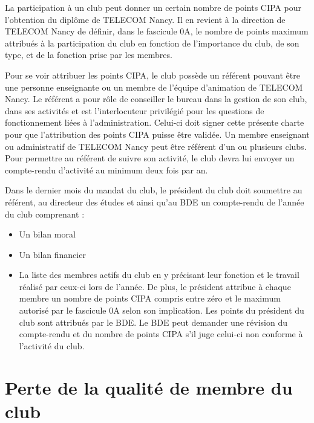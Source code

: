 \documentclass{article} %
\begin{document}
\begin{multicols}{2}
		{\small

			La participation à un club peut donner un certain nombre de
			points CIPA pour l’obtention du diplôme de TELECOM
			Nancy. Il en revient à la direction de TELECOM Nancy de
			définir, dans le fascicule 0A, le nombre de points maximum
			attribués à la participation du club en fonction de
			l’importance du club, de son type, et de la fonction prise par
			les membres.

			Pour se voir attribuer les points CIPA, le club possède un
			référent pouvant être une personne enseignante ou un
			membre de l’équipe d’animation de TELECOM Nancy. Le
			référent a pour rôle de conseiller le bureau dans la gestion
			de son club, dans ses activités et est l’interlocuteur privilégié
			pour les questions de fonctionnement liées à
			l’administration. Celui-ci doit signer cette présente charte
			pour que l’attribution des points CIPA puisse être validée.
			Un membre enseignant ou administratif de TELECOM Nancy
			peut être référent d’un ou plusieurs clubs. Pour permettre
			au référent de suivre son activité, le club devra lui envoyer
			un compte-rendu d’activité au minimum deux fois par an.

			Dans le dernier mois du mandat du club, le président du
			club doit soumettre au référent, au directeur des études et
			ainsi qu’au BDE un compte-rendu de l’année du club
			comprenant :

			\begin{itemize}
				\item Un bilan moral
				\item Un bilan financier
				\item La liste des membres actifs du club en y précisant
					leur fonction et le travail réalisé par ceux-ci lors de
					l’année. De plus, le président attribue à chaque
					membre un nombre de points CIPA compris entre
					zéro et le maximum autorisé par le fascicule 0A
					selon son implication. Les points du président du
					club sont attribués par le BDE\@.
					Le BDE peut demander une révision du compte-rendu et du
					nombre de points CIPA s’il juge celui-ci non conforme à
					l’activité du club.
			\end{itemize}

		}
		
		\section{Perte de la qualité de membre du club}


\end{multicols}
\end{document}
